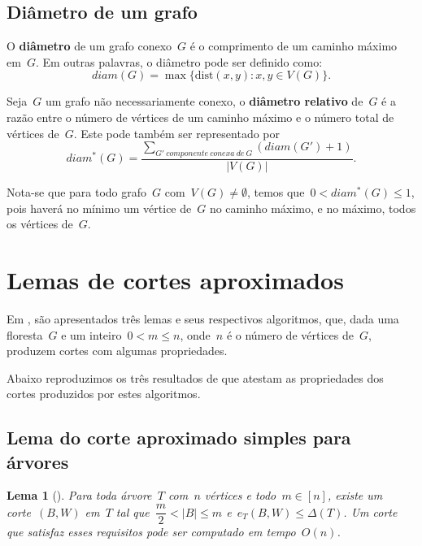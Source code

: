 \documentclass[a4paper,12pt]{article}
\newtheorem{lem}{Lema}
\newcommand{\dist}{\mathrm{dist}}
\begin{document}
	\bigskip
	\bigskip


	\subsection{Diâmetro de um grafo}
	\label{subsec:diametro}
	O \textbf{diâmetro} de um grafo conexo~$G$ é o
	comprimento de um caminho máximo em~$G$. 
	Em outras palavras, o diâmetro pode ser definido como:
	$$ diam(G)=\max\{\dist(x,y):x,y\in V(G)\}.$$

	\bigskip

	Seja~$G$ um grafo não necessariamente conexo,
	o \textbf{diâmetro relativo} de~$G$
	 é a razão entre o número
	de vértices de um caminho máximo e o número total de vértices
	de~$G$. Este pode também ser representado por
	$$ diam^*(G) =\dfrac{\displaystyle\sum_{
	G'~componente~conexa~de~G}^{}(diam(G')+1)}{|V(G)|}.$$

	\medskip

	Nota-se que para todo grafo~$G$ com~${V(G)\ne \emptyset}$, temos
	que~${0<diam^*(G)\le 1}$, pois haverá no mínimo um vértice 
	de~$G$ no caminho máximo, e no máximo, todos os vértices 
	de~$G$.
    
\newpage
\section {Lemas de cortes aproximados}

Em \cite{Schmidt15}, são apresentados três lemas e seus
respectivos algoritmos, que, dada uma floresta~$G$ e um 
inteiro~$0<m\le n$, onde~$n$ é o número de vértices de~$G$, 
produzem cortes com algumas propriedades.

Abaixo reproduzimos os três resultados de \cite{Schmidt15} que 
atestam as propriedades dos cortes produzidos por estes algoritmos.

\bigskip
\bigskip
\bigskip

\subsection{Lema do corte aproximado simples para árvores}
\begin{lem}[]
\label{lema:simpleApproxCutTree}
	Para toda árvore~$T$ com~$n$ vértices e todo~$m \in [n]$,
	existe um corte~$(B,W)$ em~$T$ tal 
	que~${\dfrac{m}{2} <|B| \le m}$ e~${e_T(B,W) \le \Delta(T)}$.
	Um corte que satisfaz esses requisitos pode ser computado em
	tempo~$O(n)$.
\end{lem}
\end{document}
